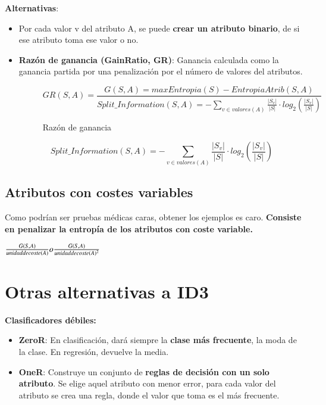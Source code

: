 \documentclass[12pt, twoside, openright]{report} %
\begin{document}
\textbf{Alternativas}:

\begin{itemize}

\item
  Por cada valor v del atributo A, se puede \textbf{crear un atributo binario}, de si ese atributo toma ese valor o no.
  \pagebreak
\item \textbf{Razón de ganancia (GainRatio, GR)}: Ganancia calculada como la ganancia partida por una penalización por el número de valores del
  atributos.
  \begin{figure}[H]
    $$
    GR(S, A)= \frac {G(S, A)=max Entropia(S)-EntropiaAtrib(S, A)}{\textit{Split\_Information}(S, A)=-\sum_{v\in valores(A)} \frac {|S_v|}{|S|} \cdot log_2(\frac {|S_v|}{|S|})}
    $$
    \captionsetup{justification=centering}
    \caption{Razón de ganancia}
  \end{figure}
  $$
  \textit{Split\_Information}(S, A)=-\sum_{v\in valores(A)} \frac {|S_v|}{|S|} \cdot log_2(\frac {|S_v|}{|S|}) 
  $$
\end{itemize}

\subsection{Atributos con costes
variables}

Como podrían ser pruebas médicas caras, obtener los ejemplos es caro.
\textbf{Consiste en penalizar la entropía de los atributos con coste
variable.}

\(\frac {G(S, A)}{unidad \space de \space coste(A)} o \frac {G(S, A)}{unidad \space de \space coste(A)^2}\)

\section{Otras alternativas a ID3}

\textbf{Clasificadores débiles:}

\begin{itemize}

\item
  \textbf{ZeroR}: En clasificación, dará siempre la \textbf{clase más
  frecuente}, la moda de la clase. En regresión, devuelve la media.
\item
  \textbf{OneR}: Construye un conjunto de \textbf{reglas de decisión con
  un solo atributo}. Se elige aquel atributo con menor error, para cada
  valor del atributo se crea una regla, donde el valor que toma es el
  más frecuente.
\end{itemize}
\end{document}
